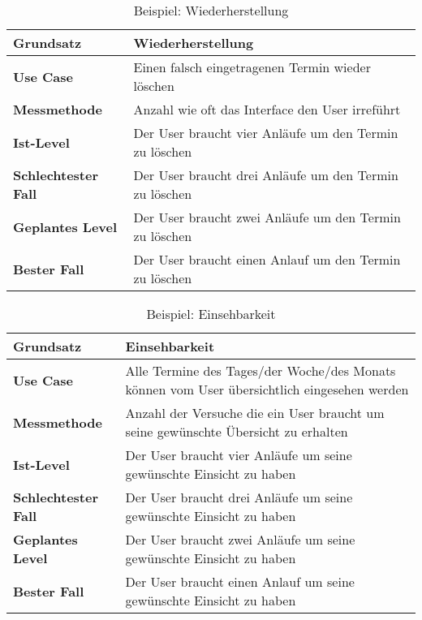 \begin{table}[h!]
    \centering
    \begin{tabular}{|l|l|}
        \hline
      \textbf{Grundsatz}  & Wiederherstellung \\
      \hline
      \textbf{Use Case}           & Einen falsch eingetragenen Termin wieder löschen  \\
      
      \textbf{Messmethode}     &     Anzahl wie oft das Interface den User irreführt         \\
      
      \textbf{Ist-Level}        &      Der User braucht vier Anläufe um den Termin zu löschen     \\
      
      \textbf{Schlechtester Fall}    &   Der User braucht drei Anläufe um den Termin zu löschen       \\
      
      \textbf{Geplantes Level}     &      Der User braucht zwei Anläufe um den Termin zu löschen        \\
      
      \textbf{Bester Fall}           &     Der User braucht einen Anlauf um den Termin zu löschen        \\
      \hline
    \end{tabular}

    \caption{Beispiel: Wiederherstellung}
    \label{tbl:wiederherstellung}

  \end{table}

\begin{table}[h!]
    \begin{tabular}{|l|l|}
        \hline
      \textbf{Grundsatz}  & Einsehbarkeit \\
      \hline
      \textbf{Use Case}           &    Alle Termine des Tages/der Woche/des Monats können vom User übersichtlich eingesehen werden \\
      
      \textbf{Messmethode}     &       Anzahl der Versuche die ein User braucht um seine gewünschte Übersicht zu erhalten       \\
      
      \textbf{Ist-Level}        &      Der User braucht vier Anläufe um seine gewünschte Einsicht zu haben       \\
      
      \textbf{Schlechtester Fall}    &       Der User braucht drei Anläufe um seine gewünschte Einsicht zu haben      \\
      
      \textbf{Geplantes Level}     &       Der User braucht zwei Anläufe um seine gewünschte Einsicht zu haben        \\
      
      \textbf{Bester Fall}           &      Der User braucht einen Anlauf um seine gewünschte Einsicht zu haben      \\
      \hline
    \end{tabular}

    \caption{Beispiel: Einsehbarkeit}
    \label{tbl:einsehbarkeit}

  \end{table}